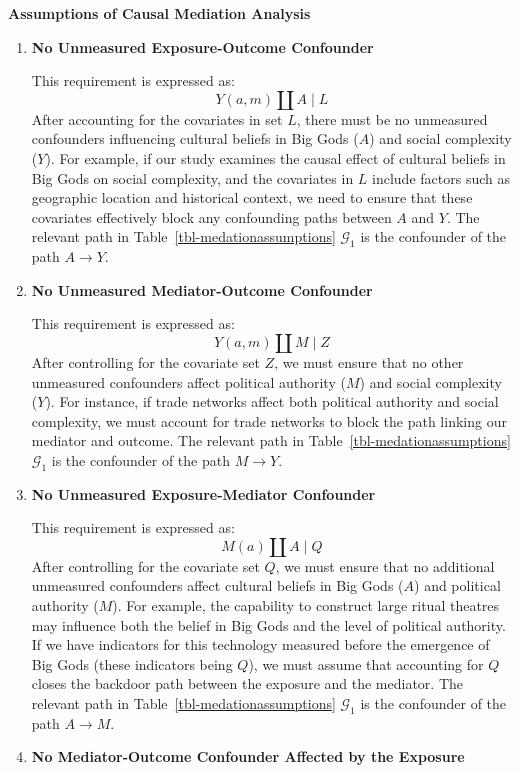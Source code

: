 \documentclass[
  single column]{article}
\begin{document}
\begin{table}

\caption{\label{tbl-medationassumptions}\textbf{Assumptions of Causal
Mediation Analysis}}

\centering{

\mediationassumptionsswig

}

\end{table}%

\begin{enumerate}
\def\labelenumi{\arabic{enumi}.}
\item
  \textbf{No Unmeasured Exposure-Outcome Confounder}

  This requirement is expressed as: \[
  Y(a, m) \coprod A \mid L
  \] After accounting for the covariates in set \(L\), there must be no
  unmeasured confounders influencing cultural beliefs in Big Gods
  (\(A\)) and social complexity (\(Y\)). For example, if our study
  examines the causal effect of cultural beliefs in Big Gods on social
  complexity, and the covariates in \(L\) include factors such as
  geographic location and historical context, we need to ensure that
  these covariates effectively block any confounding paths between \(A\)
  and \(Y\). The relevant path in Table~\ref{tbl-medationassumptions}
  \(\mathcal{G}_1\) is the confounder of the path \(A \rightarrow Y\).
\item
  \textbf{No Unmeasured Mediator-Outcome Confounder}

  This requirement is expressed as: \[
  Y(a, m) \coprod M \mid Z
  \] After controlling for the covariate set \(Z\), we must ensure that
  no other unmeasured confounders affect political authority (\(M\)) and
  social complexity (\(Y\)). For instance, if trade networks affect both
  political authority and social complexity, we must account for trade
  networks to block the path linking our mediator and outcome. The
  relevant path in Table~\ref{tbl-medationassumptions} \(\mathcal{G}_1\)
  is the confounder of the path \(M \rightarrow Y\).
\item
  \textbf{No Unmeasured Exposure-Mediator Confounder}

  This requirement is expressed as: \[
  M(a) \coprod A \mid Q
  \] After controlling for the covariate set \(Q\), we must ensure that
  no additional unmeasured confounders affect cultural beliefs in Big
  Gods (\(A\)) and political authority (\(M\)). For example, the
  capability to construct large ritual theatres may influence both the
  belief in Big Gods and the level of political authority. If we have
  indicators for this technology measured before the emergence of Big
  Gods (these indicators being \(Q\)), we must assume that accounting
  for \(Q\) closes the backdoor path between the exposure and the
  mediator. The relevant path in Table~\ref{tbl-medationassumptions}
  \(\mathcal{G}_1\) is the confounder of the path \(A \rightarrow M\).
\item
  \textbf{No Mediator-Outcome Confounder Affected by the Exposure}


\end{enumerate}
\end{document}
